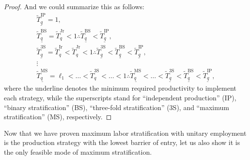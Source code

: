 \documentclass[hidelinks, nonatbib]{elsarticle}
\begin{document}
\begin{lemma}
\begin{proof}
        And we could summarize this as follows:
        \begin{gather}
            \underline{\tilde{T}_{q}^{\text{IP}}}
            = 
            1
            ,
            \\
            \underline{\tilde{T}_{q}^{\text{BS}}}
            = 
            \tilde{T}_{q}^{\text{Jr}}
            <
            1
            \therefore
            \underline{\tilde{T}_{q}^{\text{BS}}}
            <
            \underline{\tilde{T}_{q}^{\text{IP}}}
            ,
            \\
            \underline{\tilde{T}_{q}^{\text{3S}}}
            = 
            \tilde{T}_{q}^{\text{Ir}}
            <
            \tilde{T}_{q}^{\text{Jr}}
            <
            1
            \therefore
            \underline{\tilde{T}_{q}^{\text{3S}}}
            <
            \underline{\tilde{T}_{q}^{\text{BS}}}
            <
            \underline{\tilde{T}_{q}^{\text{IP}}}
            ,
            \\
            \vdots
            \\
            \underline{\tilde{T}_{q}^{\text{MS}}}
            = 
            \ell_1
            <
            \dots
            <
            \tilde{T}_{q}^{\text{3S}}
            <
            \dots
            <
            1
            \therefore
            \underline{\tilde{T}_{q}^{\text{MS}}}
            <
            \dots
            <
            \underline{\tilde{T}_{q}^{\text{3S}}}
            <
            \underline{\tilde{T}_{q}^{\text{BS}}}
            <
            \underline{\tilde{T}_{q}^{\text{IP}}}
            ,
        \end{gather}
        where the underline denotes the minimum required productivity to implement each strategy, while the superscripts stand for ``independent production'' (IP), ``binary stratification'' (BS), ``three-fold stratification'' (3S), and ``maximum stratification'' (MS), respectively.
    \end{proof}
\end{lemma}

Now that we have proven maximum labor stratification with unitary employment is the production strategy with the lowest barrier of entry, let us also show it is the only feasible mode of maximum stratification.
\end{document}
